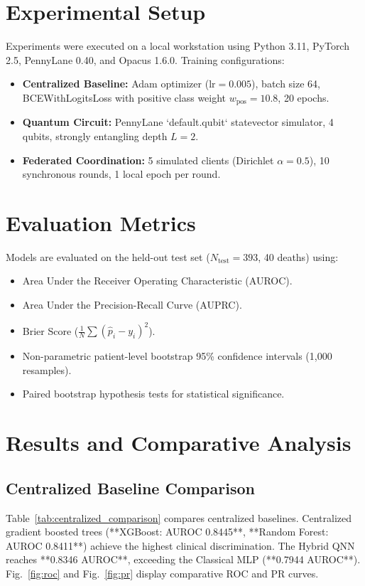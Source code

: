 \documentclass[conference]{IEEEtran}
\begin{document}
\section{Experimental Setup}
Experiments were executed on a local workstation using Python 3.11, PyTorch 2.5, PennyLane 0.40, and Opacus 1.6.0. Training configurations:
\begin{itemize}
    \item \textbf{Centralized Baseline:} Adam optimizer ($\text{lr} = 0.005$), batch size 64, BCEWithLogitsLoss with positive class weight $w_{\text{pos}} = 10.8$, 20 epochs.
    \item \textbf{Quantum Circuit:} PennyLane `default.qubit` statevector simulator, 4 qubits, strongly entangling depth $L=2$.
    \item \textbf{Federated Coordination:} 5 simulated clients (Dirichlet $\alpha=0.5$), 10 synchronous rounds, 1 local epoch per round.
\end{itemize}

\section{Evaluation Metrics}
Models are evaluated on the held-out test set ($N_{\text{test}} = 393$, 40 deaths) using:
\begin{itemize}
    \item Area Under the Receiver Operating Characteristic (AUROC).
    \item Area Under the Precision-Recall Curve (AUPRC).
    \item Brier Score ($\frac{1}{N} \sum (\hat{p}_i - y_i)^2$).
    \item Non-parametric patient-level bootstrap 95\% confidence intervals (1,000 resamples).
    \item Paired bootstrap hypothesis tests for statistical significance.
\end{itemize}

\section{Results and Comparative Analysis}
\subsection{Centralized Baseline Comparison}
Table~\ref{tab:centralized_comparison} compares centralized baselines. Centralized gradient boosted trees (**XGBoost: AUROC 0.8445**, **Random Forest: AUROC 0.8411**) achieve the highest clinical discrimination. The Hybrid QNN reaches **0.8346 AUROC**, exceeding the Classical MLP (**0.7944 AUROC**). Fig.~\ref{fig:roc} and Fig.~\ref{fig:pr} display comparative ROC and PR curves.
\end{document}
